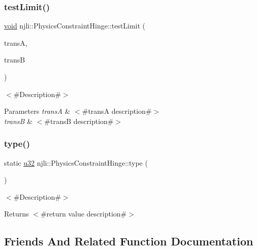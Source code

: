 \subsubsection{\texorpdfstring{test\+Limit()}{testLimit()}}
{\footnotesize\ttfamily \mbox{\hyperlink{_thread_8h_af1e856da2e658414cb2456cb6f7ebc66}{void}} njli\+::\+Physics\+Constraint\+Hinge\+::test\+Limit (\begin{DoxyParamCaption}\item[{const bt\+Transform \&}]{transA,  }\item[{const bt\+Transform \&}]{transB }\end{DoxyParamCaption})}

$<$\#\+Description\#$>$


\begin{DoxyParams}{Parameters}
{\em transA} & $<$\#transA description\#$>$ \\
\hline
{\em transB} & $<$\#transB description\#$>$ \\
\hline
\end{DoxyParams}
\mbox{\label{classnjli_1_1_physics_constraint_hinge_a567c2dc54151dbcffb8e26590bc6bfb5}} 
\subsubsection{\texorpdfstring{type()}{type()}}
{\footnotesize\ttfamily static \mbox{\hyperlink{_util_8h_a10e94b422ef0c20dcdec20d31a1f5049}{u32}} njli\+::\+Physics\+Constraint\+Hinge\+::type (\begin{DoxyParamCaption}{ }\end{DoxyParamCaption})\hspace{0.3cm}{\ttfamily [static]}}

$<$\#\+Description\#$>$

\begin{DoxyReturn}{Returns}
$<$\#return value description\#$>$ 
\end{DoxyReturn}


\subsection{Friends And Related Function Documentation}
\mbox{\label{classnjli_1_1_physics_constraint_hinge_acb96ebb09abe8f2a37a915a842babfac}} 
